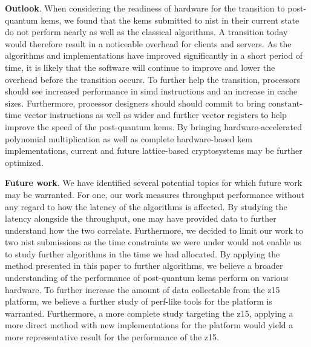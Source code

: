 


\textbf{Outlook}. When considering the readiness of hardware for the transition to \gls{post-quantum} \glspl{kem}, we found that the \glspl{kem} submitted to \gls{nist} in their current state do not perform nearly as well as the classical algorithms. A transition today would therefore result in a noticeable overhead for clients and servers. As the algorithms and implementations have improved significantly in a short period of time, it is likely that the software will continue to improve and lower the overhead before the transition occurs. To further help the transition, processors should see increased performance in \gls{simd} instructions and an increase in cache sizes. Furthermore, processor designers should should commit to bring constant-time vector instructions as well as wider and further vector registers to help improve the speed of the \gls{post-quantum} \glspl{kem}. By bringing hardware-accelerated polynomial multiplication as well as complete hardware-based \gls{kem} implementations, current and future lattice-based cryptosystems may be further optimized.


\textbf{Future work}. We have identified several potential topics for which future work may be warranted. For one, our work measures throughput performance without any regard to how the latency of the algorithms is affected. By studying the latency alongside the throughput, one may have provided data to further understand how the two correlate. Furthermore, we decided to limit our work to two \gls{nist} submissions as the time constraints we were under would not enable us to study further algorithms in the time we had allocated. By applying the method presented in this paper to further algorithms, we believe a broader understanding of the performance of \gls{post-quantum} \glspl{kem} perform on various hardware. To further increase the amount of data collectable from the \gls{z15} platform, we believe a further study of perf-like tools for the platform is warranted. Furthermore, a more complete study targeting the \gls{z15}, applying a more direct method with new implementations for the platform would yield a more representative result for the performance of the \gls{z15}.